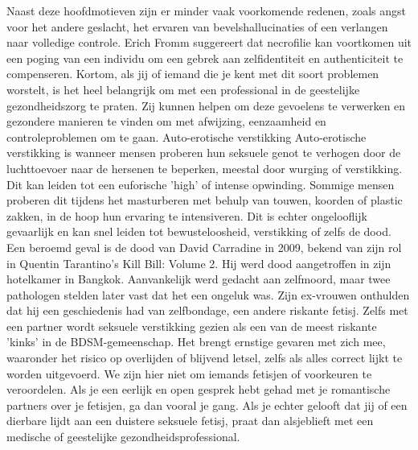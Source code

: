 Naast deze hoofdmotieven zijn er minder vaak voorkomende redenen, zoals angst voor het andere geslacht, het ervaren van bevelshallucinaties of een verlangen naar volledige controle. Erich Fromm suggereert dat necrofilie kan voortkomen uit een poging van een individu om een gebrek aan zelfidentiteit en authenticiteit te compenseren.
Kortom, als jij of iemand die je kent met dit soort problemen worstelt, is het heel belangrijk om met een professional in de geestelijke gezondheidszorg te praten. Zij kunnen helpen om deze gevoelens te verwerken en gezondere manieren te vinden om met afwijzing, eenzaamheid en controleproblemen om te gaan.
Auto-erotische verstikking
Auto-erotische verstikking is wanneer mensen proberen hun seksuele genot te verhogen door de luchttoevoer naar de hersenen te beperken, meestal door wurging of verstikking. Dit kan leiden tot een euforische 'high' of intense opwinding. Sommige mensen proberen dit tijdens het masturberen met behulp van touwen, koorden of plastic zakken, in de hoop hun ervaring te intensiveren. Dit is echter ongelooflijk gevaarlijk en kan snel leiden tot bewusteloosheid, verstikking of zelfs de dood.
Een beroemd geval is de dood van David Carradine in 2009, bekend van zijn rol in Quentin Tarantino's Kill Bill: Volume 2. Hij werd dood aangetroffen in zijn hotelkamer in Bangkok. Aanvankelijk werd gedacht aan zelfmoord, maar twee pathologen stelden later vast dat het een ongeluk was. Zijn ex-vrouwen onthulden dat hij een geschiedenis had van zelfbondage, een andere riskante fetisj.
Zelfs met een partner wordt seksuele verstikking gezien als een van de meest riskante 'kinks' in de BDSM-gemeenschap. Het brengt ernstige gevaren met zich mee, waaronder het risico op overlijden of blijvend letsel, zelfs als alles correct lijkt te worden uitgevoerd.
We zijn hier niet om iemands fetisjen of voorkeuren te veroordelen. Als je een eerlijk en open gesprek hebt gehad met je romantische partners over je fetisjen, ga dan vooral je gang. Als je echter gelooft dat jij of een dierbare lijdt aan een duistere seksuele fetisj, praat dan alsjeblieft met een medische of geestelijke gezondheidsprofessional.

